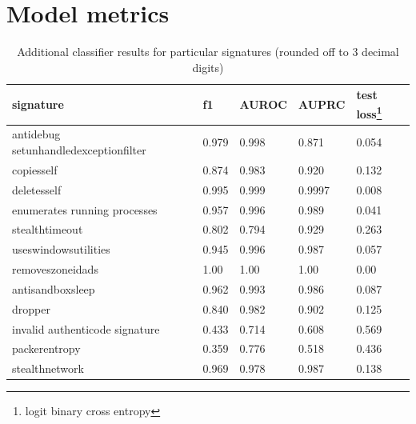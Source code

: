\chapter{Model metrics} \label{app:models}

\begin{table}[h]
    \centering
    \caption{Additional classifier results for particular signatures (rounded off to 3 decimal digits)}
    \begin{minipage}{\linewidth}
    \begin{tabular}{lllll}
      \toprule
      \textbf{signature} &
      \textbf{f1} &
      \textbf{AUROC} &
      \textbf{AUPRC} &
      \textbf{test loss}\footnote{logit binary cross entropy}
      \\
      \midrule
      antidebug setunhandledexceptionfilter & 0.979 & 0.998 & 0.871 & 0.054  \\
      \midrule
      copiesself &  0.874 & 0.983 & 0.920 & 0.132 \\
      \midrule
      deletesself &  0.995 & 0.999 & 0.9997 & 0.008 \\
      \midrule
      enumerates running processes & 0.957 & 0.996 & 0.989 & 0.041 \\
      \midrule
      stealthtimeout & 0.802 & 0.794 & 0.929 &  0.263 \\
      \midrule
      useswindowsutilities & 0.945 & 0.996 & 0.987 &  0.057 \\
      \midrule
      removeszoneidads & 1.00 & 1.00 & 1.00 & 0.00 \\
      \midrule
      antisandboxsleep & 0.962 & 0.993 & 0.986 & 0.087 \\
      \midrule
      dropper & 0.840 & 0.982 & 0.902 & 0.125 \\
      \midrule
      invalid authenticode signature & 0.433 & 0.714 & 0.608 & 0.569 \\
      \midrule
      packerentropy & 0.359 & 0.776 & 0.518 & 0.436 \\
      \midrule
      stealthnetwork & 0.969 & 0.978 & 0.987 & 0.138 \\
      \bottomrule
    \end{tabular}
    \end{minipage}
    \label{tab:additional_metrics}
  \end{table}


